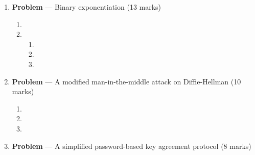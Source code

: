 \documentclass[11pt]{article}
\theoremstyle{definition}
\newcounter{problem}
\begin{document}
\begin{enumerate}
\begin{enumerate}
\item

\begin{enumerate}
\item

\item

\item

\item

\item

\end{enumerate}

\item
\end{enumerate}

\newpage


\item[] \textbf{Problem \theproblem} ---  Binary exponentiation (13 marks)

\begin{enumerate}
\item

\item
\begin{enumerate}
\item

\item

\item
\end{enumerate}
\end{enumerate}

\newpage

\item[] \textbf{Problem \theproblem} --- A modified man-in-the-middle attack on Diffie-Hellman
    (10 marks)

\begin{enumerate}
\item

\item

\item

\end{enumerate}

\newpage

\item[] \textbf{Problem \theproblem} --- A simplified password-based key agreement protocol (8
    marks)


\end{enumerate}
\end{document}
